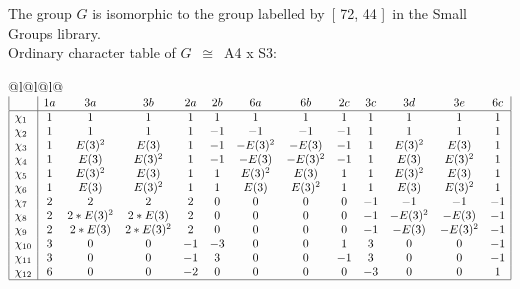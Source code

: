 \documentclass[varwidth=\maxdimen,border=10]{standalone}
\begin{document}
The group $G$ is isomorphic to the group labelled by\ [ 72, 44 ]\ in the Small Groups library.\\
Ordinary character table of $G$\ $\cong$\ A4 x S3:\\
\begin{center}
\begin{tabular}{@{}l@{}l@{}l@{}}
\hline
\(\begin{array}{|l|cccccccccccc|}
  & 1a & 3a & 3b & 2a & 2b & 6a & 6b & 2c & 3c & 3d & 3e & 6c\\ \hline
\chi_{1} & 1 & 1 & 1 & 1 & 1 & 1 & 1 & 1 & 1 & 1 & 1 & 1\\
\chi_{2} & 1 & 1 & 1 & 1 & -1 & -1 & -1 & -1 & 1 & 1 & 1 & 1\\
\chi_{3} & 1 & E(3)^{2} & E(3) & 1 & -1 & -E(3)^{2} & -E(3) & -1 & 1 & E(3)^{2} & E(3) & 1\\
\chi_{4} & 1 & E(3) & E(3)^{2} & 1 & -1 & -E(3) & -E(3)^{2} & -1 & 1 & E(3) & E(3)^{2} & 1\\
\chi_{5} & 1 & E(3)^{2} & E(3) & 1 & 1 & E(3)^{2} & E(3) & 1 & 1 & E(3)^{2} & E(3) & 1\\
\chi_{6} & 1 & E(3) & E(3)^{2} & 1 & 1 & E(3) & E(3)^{2} & 1 & 1 & E(3) & E(3)^{2} & 1\\
\chi_{7} & 2 & 2 & 2 & 2 & 0 & 0 & 0 & 0 & -1 & -1 & -1 & -1\\
\chi_{8} & 2 & 2*E(3)^{2} & 2*E(3) & 2 & 0 & 0 & 0 & 0 & -1 & -E(3)^{2} & -E(3) & -1\\
\chi_{9} & 2 & 2*E(3) & 2*E(3)^{2} & 2 & 0 & 0 & 0 & 0 & -1 & -E(3) & -E(3)^{2} & -1\\
\chi_{10} & 3 & 0 & 0 & -1 & -3 & 0 & 0 & 1 & 3 & 0 & 0 & -1\\
\chi_{11} & 3 & 0 & 0 & -1 & 3 & 0 & 0 & -1 & 3 & 0 & 0 & -1\\
\chi_{12} & 6 & 0 & 0 & -2 & 0 & 0 & 0 & 0 & -3 & 0 & 0 & 1\\
\hline
\end{array}\)\\
\end{tabular}
\end{center}
\end{document}

